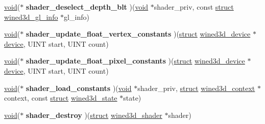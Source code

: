 \begin{DoxyCompactItemize}
\item 
\mbox{\label{structwined3d__shader__backend__ops_a9a0772bb18d5c75b44f0847adf21c85d}} 
\hyperlink{interfacevoid}{void}($\ast$ {\bfseries shader\+\_\+deselect\+\_\+depth\+\_\+blt} )(\hyperlink{interfacevoid}{void} $\ast$shader\+\_\+priv, const \hyperlink{interfacestruct}{struct} \hyperlink{structwined3d__gl__info}{wined3d\+\_\+gl\+\_\+info} $\ast$gl\+\_\+info)
\item 
\mbox{\label{structwined3d__shader__backend__ops_a699d73f09e8946883aabd29fccc66dd0}} 
\hyperlink{interfacevoid}{void}($\ast$ {\bfseries shader\+\_\+update\+\_\+float\+\_\+vertex\+\_\+constants} )(\hyperlink{interfacestruct}{struct} \hyperlink{structwined3d__device}{wined3d\+\_\+device} $\ast$\hyperlink{structdevice}{device}, U\+I\+NT start, U\+I\+NT count)
\item 
\mbox{\label{structwined3d__shader__backend__ops_aafe5fa4b13ff7fadcad83d36e7c1d942}} 
\hyperlink{interfacevoid}{void}($\ast$ {\bfseries shader\+\_\+update\+\_\+float\+\_\+pixel\+\_\+constants} )(\hyperlink{interfacestruct}{struct} \hyperlink{structwined3d__device}{wined3d\+\_\+device} $\ast$\hyperlink{structdevice}{device}, U\+I\+NT start, U\+I\+NT count)
\item 
\mbox{\label{structwined3d__shader__backend__ops_a34a68dbf4282452abfaa4aa929bf4b18}} 
\hyperlink{interfacevoid}{void}($\ast$ {\bfseries shader\+\_\+load\+\_\+constants} )(\hyperlink{interfacevoid}{void} $\ast$shader\+\_\+priv, \hyperlink{interfacestruct}{struct} \hyperlink{structwined3d__context}{wined3d\+\_\+context} $\ast$context, const \hyperlink{interfacestruct}{struct} \hyperlink{structwined3d__state}{wined3d\+\_\+state} $\ast$state)
\item 
\mbox{\label{structwined3d__shader__backend__ops_af7abde0017c3bcb19f2ff95d9c0e7de7}} 
\hyperlink{interfacevoid}{void}($\ast$ {\bfseries shader\+\_\+destroy} )(\hyperlink{interfacestruct}{struct} \hyperlink{structwined3d__shader}{wined3d\+\_\+shader} $\ast$shader)
\item 
\mbox{\label{structwined3d__shader__backend__ops_ae62588399025b30e9d2f0abc7937cfca}} 

\end{DoxyCompactItemize}
